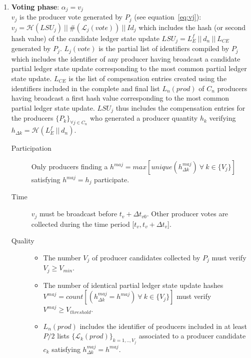 \begin{enumerate}
\item \textbf{Voting phase}: $\alpha_j = v_j$\\
$v_j$ is the producer vote generated by $P_j$ (see equation~\ref{eq:vj}):\\
$v_j = \mathcal{H}(LSU_j)~||~\#(\mathcal{L}_j(vote))~||~Id_j$ which includes the hash (or second hash value) of the candidate ledger state update $LSU_j = L^f_E~||~d_n~||~L_{CE}$ generated by $P_j$. $L_j(vote)$ is the partial list of identifiers compiled by $P_j$ which includes the identifier of any producer having broadcast a candidate partial ledger state update corresponding to the most common partial ledger state update. $L_{CE}$ is the list of compensation entries created using the identifiers included in the complete and final list $L_n(prod)$ of $C_n$ producers having broadcast a first hash value corresponding to the most common partial ledger state update. $LSU_j$ thus includes the compensation entries for the producers $\{P_k\}_{\forall j\in C_n}$ who generated a producer quantity $h_k$ verifying $h_{\Delta k} = \mathcal{H}(L^f_E~||~d_n)$.
\begin{description}
\item[Participation] Only producers finding a $h^{maj} = max[unique(h^{maj}_{\Delta k})~\forall~k\in\{V_j\}]$ satisfying $h^{maj} = h_j$ participate.
\item[Time] $v_j$ must be broadcast before $t_v + \Delta t_{v0}$. Other producer votes are collected during the time period [$t_v, t_v + \Delta t_{v}$].
\item[Quality] 
\begin{itemize}
\item The number $V_j$ of producer candidates collected by $P_j$ must verify $V_j \geq V_{min}$.
\item The number of identical partial ledger state update hashes $V^{maj} = count[(h^{maj}_{\Delta k} = h^{maj})~\forall~k\in\{V_j\}]$ must verify $V^{maj} \geq V_{threshold}$.
\item $L_n(prod)$ includes the identifier of producers included in at least $P/2$ lists $\{\mathcal{L}_{k}(prod)\}_{k=1,..,V_j}$ associated to a producer candidate $c_{k}$ satisfying $h^{maj}_{\Delta k} = h^{maj}$.
\end{itemize}
\end{description}


\end{enumerate}
